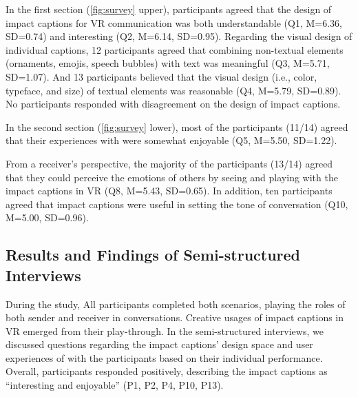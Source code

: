 In the first section (\autoref{fig:survey} upper), participants agreed that the design of impact captions for VR communication was both understandable (Q1, M=6.36, SD=0.74) and interesting (Q2, M=6.14, SD=0.95). 
Regarding the visual design of individual captions, 12 participants agreed that combining non-textual elements (ornaments, emojis, speech bubbles) with text was meaningful (Q3, M=5.71, SD=1.07). 
And 13 participants believed that the visual design (i.e., color, typeface, and size) of textual elements was reasonable (Q4, M=5.79, SD=0.89). No participants responded with disagreement on the design of impact captions.

In the second section (\autoref{fig:survey} lower), most of the participants (11/14) agreed that their experiences with \system{} were somewhat enjoyable (Q5, M=5.50, SD=1.22). 


From a receiver's perspective, the majority of the participants (13/14) agreed that they could perceive the emotions of others by seeing and playing with the impact captions in VR (Q8, M=5.43, SD=0.65). 
In addition, ten participants agreed that impact captions were useful in setting the tone of conversation (Q10, M=5.00, SD=0.96).

\subsection{Results and Findings of Semi-structured Interviews}
During the study, All participants completed both scenarios, playing the roles of both sender and receiver in conversations. Creative usages of impact captions in VR emerged from their play-through. 
In the semi-structured interviews, we discussed questions regarding the impact captions' design space and user experiences of \system{} with the participants based on their individual performance.
Overall, participants responded positively, describing the impact captions as ``interesting and enjoyable'' (P1, P2, P4, P10, P13).

